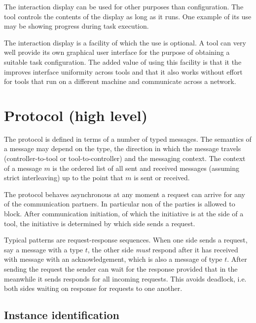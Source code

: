 \documentclass{article}
\begin{document}
   The interaction display can be used for other purposes than configuration.
   The tool controls the contents of the display as long as it runs. One
   example of its use may be showing progress during task execution.

   The interaction display is a facility of which the use is optional. A tool
   can very well provide its own graphical user interface for the purpose of
   obtaining a suitable task configuration. The added value of using this
   facility is that it the improves interface uniformity across tools and that
   it also works without effort for tools that run on a different machine and
   communicate across a network.

 \section{Protocol (high level)} \label{s:message_definitions}

  The protocol is defined in terms of a number of typed messages. The semantics
  of a message may depend on the type, the direction in which the message
  travels (controller-to-tool or tool-to-controller) and the messaging context.
  The context of a message $m$ is the ordered list of all sent and received
  messages (assuming strict interleaving) up to the point that $m$ is sent or
  received.

  The protocol behaves asynchronous at any moment a request can arrive for any
  of the communication partners. In particular non of the parties is allowed to
  block. After communication initiation, of which the initiative is at the side
  of a tool, the initiative is determined by which side sends a request.

  Typical patterns are request-response sequences. When one side sends a
  request, say a message with a type $t$, the other side \emph{must} respond
  after it has received with message with an acknowledgement, which is also a
  message of type $t$. After sending the request the sender can wait for the
  response provided that in the meanwhile it sends responds for all incoming
  requests. This avoids deadlock, i.e. both sides waiting on response for
  requests to one another.

  \subsection{Instance identification} \label{s:instance_identification}
\end{document}

